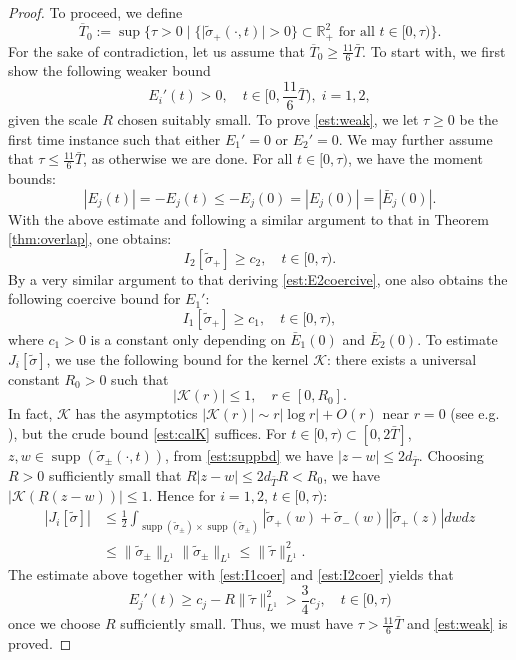 \documentclass[11pt,reqno]{amsproc}
\newcommand{\R}{\mathbb{R}}
\newcommand{\calK}{\mathcal{K}}
\newcommand{\tsig}{\tilde{\sigma}}
\DeclareMathOperator{\supp}{supp}
\begin{document}
\begin{proof}
    To proceed, we define 
    $$
    \overline{T}_0 := \sup\{\tau > 0\;|\; \{|\tilde\sigma_+(\cdot,t)| > 0\} \subset \R_+^2 \text{ for all } t\in [0,\tau)\}.
    $$
    For the sake of contradiction, let us assume that $\overline{T}_0 \ge \frac{11}{6}\bar{T}$. To start with, we first show the following weaker bound
    \begin{equation}
        \label{est:weak}
        E_i'(t) > 0,\quad t \in [0,\frac{11}{6}\bar{T}),\; i = 1,2,
    \end{equation}
    given the scale $R$ chosen suitably small. To prove \eqref{est:weak}, we let $\tau \ge 0$ be the first time instance such that either $E_1' = 0$ or $E_2' = 0$. We may further assume that $\tau \le \frac{11}{6}\bar T$, as otherwise we are done. For all $t \in [0,\tau)$, we have the moment bounds:
    \begin{equation}\label{apriorimoment}
    |E_j(t)| = -E_j(t) \le -E_j(0) = |E_j(0)| = |\bar E_j(0)|.
    \end{equation}
    With the above estimate and following a similar argument to that in Theorem \ref{thm:overlap}, one obtains:
    \begin{equation}\label{est:I2coer}
    I_2[\tsig_+] \ge c_2,\quad t \in [0,\tau).
    \end{equation}
    By a very similar argument to that deriving \eqref{est:E2coercive}, one also obtains the following coercive bound for $E_1'$:
    \begin{equation}\label{est:I1coer}
    I_1[\tsig_+] \ge c_1, \quad t \in [0,\tau),
    \end{equation}
    where $c_1 > 0$ is a constant only depending on $\bar E_1(0)$ and $\bar E_2(0)$. To estimate $J_i[\tsig]$, we use the following bound for the kernel $\calK$: there exists a universal constant $R_0 > 0$ such that
    \begin{equation}\label{est:calK}
    |\calK(r)| \le 1,\quad r \in [0,R_0].
    \end{equation}
    In fact, $\calK$ has the asymptotics $|\calK(r)| \sim r |\log r| + O(r)$ near $r = 0$ (see e.g. \cite{bessel1, bessel}), but the crude bound \eqref{est:calK} suffices. For $t \in [0,\tau) \subset [0, 2\bar T]$, $z, w \in \supp(\tsig_\pm(\cdot,t))$, from \eqref{est:suppbd} we have $|z - w| \le 2d_{\bar T}$. Choosing $R > 0$ sufficiently small that $R|z-w| \le 2d_{\bar T} R < R_0$, we have $|\calK(R(z-w))| \le 1$. Hence for $i = 1,2$, $t \in [0,\tau)$:
    \begin{align*}
        |J_i[\tsig]| &\le \frac12\int_{\supp(\tsig_\pm) \times \supp(\tsig_\pm)} |\tsig_+(w) + \tsig_-(w)| |\tsig_+(z)| dwdz\\
        &\le \|\tsig_\pm\|_{L^1} \|\tsig_\pm\|_{L^1}\le \|\tilde \tau\|_{L^1}^2.
    \end{align*}
    The estimate above together with \eqref{est:I1coer} and \eqref{est:I2coer} yields that
    $$
    E_j'(t) \ge c_j - R\|\tilde\tau\|_{L^1}^2 > \frac{3}{4} c_j,\quad t \in [0,\tau)
    $$
    once we choose $R$ sufficiently small. Thus, we must have $\tau > \frac{11}{6}\bar T$ and \eqref{est:weak} is proved.


\end{proof}
\end{document}
